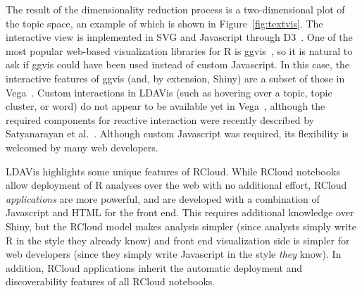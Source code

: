 The result of the dimensionality reduction process is a
two-dimensional plot of the topic space, an example of which is shown in
Figure~\ref{fig:textvis}. The interactive view is implemented in SVG
and Javascript through D3~\cite{Bostock:2011:DDD}. One of the most
popular web-based visualization libraries for R is ggvis~\cite{ggvis},
so it is natural to ask if ggvis could have been used instead of
custom Javascript. In this case, the interactive features of ggvis
(and, by extension, Shiny) are a subset of those in Vega~\cite{vega}.
Custom interactions in LDAVis (such as hovering over a topic,
topic cluster, or word) do not appear to be available yet in Vega~\cite{vega},
although the required components for reactive interaction were
recently described by Satyanarayan et
al.~\cite{Satyanarayan:2014:DID}.
Although custom Javascript was required, its flexibility is welcomed
by many web developers.

LDAVis highlights some unique features of RCloud.
While RCloud notebooks allow deployment of R analyses over
the web with no additional effort, RCloud \emph{applications} are more
powerful, and are developed with a combination of Javascript and HTML
for the front end. This requires additional knowledge over Shiny, but
the RCloud model makes analysis simpler (since analysts
simply write R in the style they already know)
and front end visualization side is simpler for web
developers (since they simply write Javascript in
the style \emph{they} know). In addition, RCloud applications
inherit the automatic deployment and discoverability features of
all RCloud notebooks.

%
